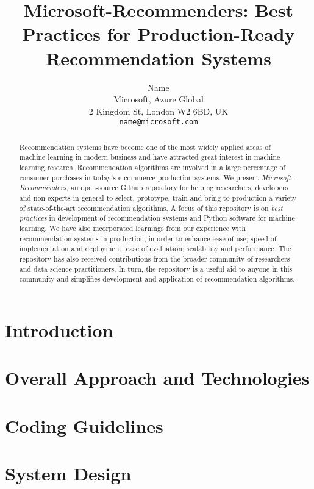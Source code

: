 \documentclass{article}
\title{Microsoft-Recommenders: Best Practices for Production-Ready Recommendation Systems}
\author{%
  Name \\
  Microsoft, Azure Global \\
  2 Kingdom St, London W2 6BD, UK \\
  \texttt{name@microsoft.com} \\
}
\begin{document}
\maketitle

\begin{abstract}
Recommendation systems have become one of the most widely applied areas of machine learning in modern business and 
have attracted great interest in machine learning research. Recommendation algorithms are involved in a large percentage of 
consumer purchases in today's e-commerce production systems. We present {\em Microsoft-Recommenders},  
an open-source Github repository for helping researchers, developers and non-experts in general to select, prototype, train and
bring to production a variety of state-of-the-art recommendation algorithms.
A focus of this repository is on {\em best practices} in development of recommendation systems and Python software for machine learning.
We have also incorporated learnings from our experience with recommendation systems in production, in order to enhance ease of use; speed of 
implementation and deployment; ease of evaluation; scalability and performance. 
The repository has also received contributions from the broader community of researchers and data science practitioners. 
In turn, the repository is a useful aid to anyone in this community and simplifies development and application of recommendation algorithms.
\end{abstract}

\section{Introduction}



\section{Overall Approach and Technologies}



\section{Coding Guidelines}



\section{System Design}
\end{document}
